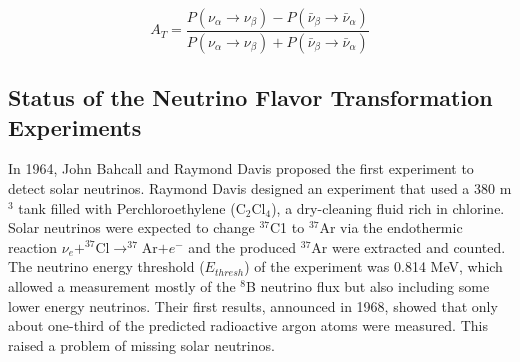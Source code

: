 \[
A_T = \frac{P(\nu_\alpha\to\nu_\beta)-P(\bar{\nu}_\beta\to\bar{\nu}_\alpha)}{P(\nu_\alpha\to\nu_\beta)+P(\bar{\nu}_\beta\to\bar{\nu}_\alpha)}
\]


\subsection{Status of the Neutrino Flavor Transformation Experiments}
In 1964, John Bahcall and Raymond Davis proposed the first experiment to detect solar neutrinos\cite{bahcall1964solar,davis1964solar}. Raymond Davis designed an experiment that used a 380 m$^3$ tank filled with Perchloroethylene (C$_2$Cl$_4$), a dry-cleaning fluid rich in chlorine. Solar neutrinos were expected to change $^{37}$C1 to $^{37}$Ar via the endothermic reaction $\nu_e+^{37}$Cl$\to^{37}$Ar$+e^-$ and the produced $^{37}$Ar were extracted and counted. The neutrino energy threshold ($E_{thresh}$) of the experiment was 0.814 MeV, which allowed a measurement mostly of the $^8$B neutrino flux but also including some lower energy neutrinos\cite{davis1964solar}. Their first results, announced in 1968, showed that only about one-third of the predicted radioactive argon atoms were measured. This raised a problem of missing solar neutrinos.

